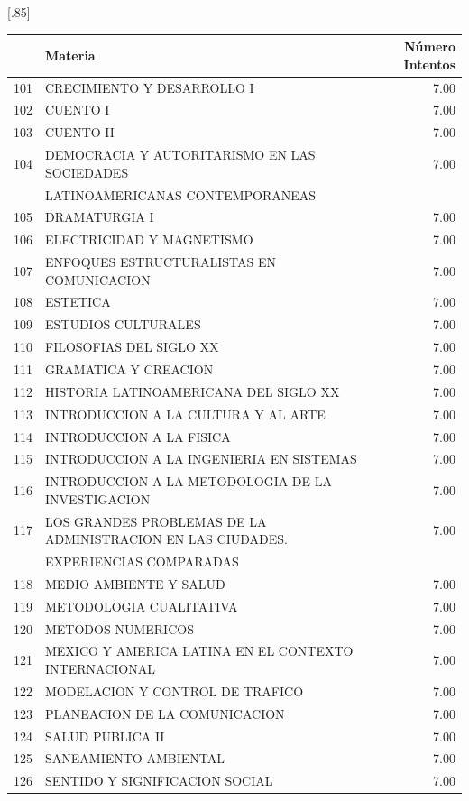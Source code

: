 \documentclass[12pt]{article}
\begin{document}
\begin{table}[ht]
\centering
\scalebox{0.75}[.85]{
\begin{tabular}{rlr}
  \hline
 & Materia & N\'umero Intentos  \\ 
  \hline
  101 & CRECIMIENTO Y DESARROLLO I & 7.00 \\ 
  102 & CUENTO I & 7.00 \\ 
  103 & CUENTO II & 7.00 \\ 
  104 & DEMOCRACIA Y AUTORITARISMO EN LAS SOCIEDADES  & 7.00 \\ 
  & LATINOAMERICANAS CONTEMPORANEAS &  \\ 
 105 & DRAMATURGIA I & 7.00 \\ 
  106 & ELECTRICIDAD Y MAGNETISMO & 7.00 \\ 
  107 & ENFOQUES ESTRUCTURALISTAS EN COMUNICACION & 7.00 \\ 
  108 & ESTETICA & 7.00 \\ 
  109 & ESTUDIOS CULTURALES & 7.00 \\ 
  110 & FILOSOFIAS DEL SIGLO XX & 7.00 \\ 
  111 & GRAMATICA Y CREACION & 7.00 \\ 
  112 & HISTORIA LATINOAMERICANA DEL SIGLO XX & 7.00 \\ 
  113 & INTRODUCCION A LA CULTURA Y AL ARTE & 7.00 \\ 
  114 & INTRODUCCION A LA FISICA & 7.00 \\ 
  115 & INTRODUCCION A LA INGENIERIA EN SISTEMAS & 7.00 \\ 
  116 & INTRODUCCION A LA METODOLOGIA DE LA INVESTIGACION & 7.00 \\ 
  117 & LOS GRANDES PROBLEMAS DE LA ADMINISTRACION EN LAS CIUDADES.  & 7.00 \\ 
 & EXPERIENCIAS COMPARADAS &  \\ 
  118 & MEDIO AMBIENTE Y SALUD & 7.00 \\ 
  119 & METODOLOGIA CUALITATIVA & 7.00 \\ 
  120 & METODOS NUMERICOS & 7.00 \\ 
  121 & MEXICO Y AMERICA LATINA EN EL CONTEXTO INTERNACIONAL & 7.00 \\ 
  122 & MODELACION Y CONTROL DE TRAFICO & 7.00 \\ 
  123 & PLANEACION DE LA COMUNICACION & 7.00 \\ 
  124 & SALUD PUBLICA II & 7.00 \\ 
  125 & SANEAMIENTO AMBIENTAL & 7.00 \\ 
  126 & SENTIDO Y SIGNIFICACION SOCIAL & 7.00 \\ 

\end{tabular}}
\end{table}
\end{document}
